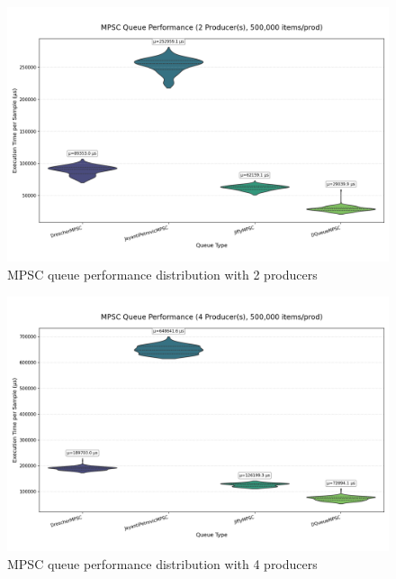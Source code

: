 \begin{figure}[H]
\centering
\caption{MPSC queue performance distribution with 2 producers}
\label{fig:mpsc-violin-2p}
\includegraphics[width=\textwidth]{images/results/mpsc_performance_violin_2_producers.png}
\end{figure}

\begin{figure}[H]
\centering
\caption{MPSC queue performance distribution with 4 producers}
\label{fig:mpsc-violin-4p}
\includegraphics[width=\textwidth]{images/results/mpsc_performance_violin_4_producers.png}
\end{figure}

